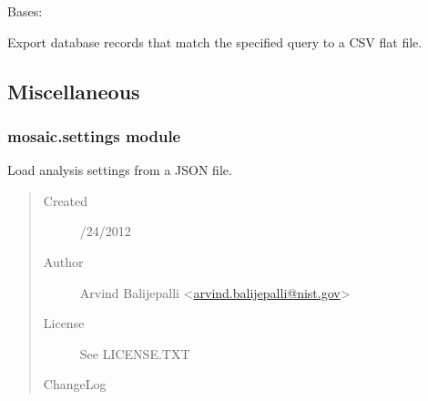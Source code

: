 \documentclass[letterpaper,10pt,english]{sphinxmanual}
\begin{document}

\begin{fulllineitems}
\label{api-doc/mosaic.output:mosaic.sqlite3MDIO.sqlite3MDIO}
Bases: {\hyperref[api\string-doc/mosaic.meta:mosaic.metaMDIO.metaMDIO]{\emph{}}}

\begin{fulllineitems}
\label{api-doc/mosaic.output:mosaic.sqlite3MDIO.sqlite3MDIO.exportToCSV}
Export database records that match the specified query to a CSV flat file.

\end{fulllineitems}


\end{fulllineitems}



\subsection{Miscellaneous}
\label{api-doc/mosaic.misc::doc}\label{api-doc/mosaic.misc:miscellaneous}

\subsubsection{mosaic.settings module}
\label{api-doc/mosaic.misc:mosaic-settings-module}\label{api-doc/mosaic.misc:module-mosaic.settings}
Load analysis settings from a JSON file.
\begin{quote}\begin{description}
\item[{Created}] /24/2012

\item[{Author}] \leavevmode
Arvind Balijepalli \textless{}\href{mailto:arvind.balijepalli@nist.gov}{arvind.balijepalli@nist.gov}\textgreater{}

\item[{License}] \leavevmode
See LICENSE.TXT

\item[{ChangeLog}] \leavevmode
\end{description}\end{quote}
\end{document}
